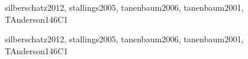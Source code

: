 \begin{syllabus}
\begin{unit}{\OSMemoryManagement}{}{silberschatz2012, stallings2005, tanenbaum2006, tanenbaum2001, TAnderson14}{6}{C1}
\begin{topics}%
	\item \OSMemoryManagementTopicReview
	\item \OSMemoryManagementTopicWorking
	\item \OSMemoryManagementTopicCaching
\end{topics}
\begin{learningoutcomes}
	\item \OSMemoryManagementLOExplainMemory [\Familiarity]
	\item \OSMemoryManagementLOSummarizeTheVirtual [\Familiarity]
	\item \OSMemoryManagementLOEvaluateTheIn [\Assessment]
	\item \OSMemoryManagementLODefend [\Familiarity]
	\item \OSMemoryManagementLODescribeTheAndCache [\Familiarity]
	\item \OSMemoryManagementLODiscussTheThrashing [\Familiarity]
\end{learningoutcomes}
\end{unit}

\begin{unit}{\OSSecurityandProtection}{}{silberschatz2012, stallings2005, tanenbaum2006, tanenbaum2001, TAnderson14}{6}{C1}
\begin{topics}
      \item \OSSecurityandProtectionTopicOverview
      \item \OSSecurityandProtectionTopicPolicy
      \item \OSSecurityandProtectionTopicSecurity
      \item \OSSecurityandProtectionTopicProtection
      \item \OSSecurityandProtectionTopicBackups
\end{topics}
\begin{learningoutcomes}
	\item \OSSecurityandProtectionLOArticulateTheProtection [\Familiarity]
	\item \OSSecurityandProtectionLOSummarizeTheLimitations [\Familiarity]
	\item \OSSecurityandProtectionLOExplainTheIn [\Familiarity]
	\item \OSSecurityandProtectionLOCarry [\Familiarity]
\end{learningoutcomes}
\end{unit}


\end{syllabus}

